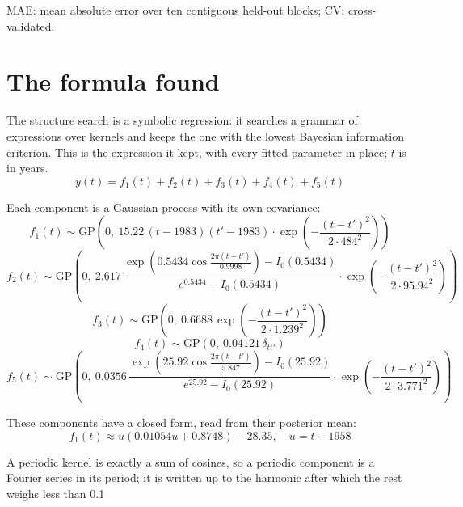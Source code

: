 \documentclass[11pt,a4paper]{article}
\begin{document}
MAE: mean absolute error over ten contiguous held-out blocks; CV: cross-validated.

\section*{The formula found}

The structure search is a symbolic regression: it searches a grammar of expressions over kernels and keeps the one with the lowest Bayesian information criterion. This is the expression it kept, with every fitted parameter in place; $t$ is in years.
\begin{dmath*}
y(t) = f_{1}(t) + f_{2}(t) + f_{3}(t) + f_{4}(t) + f_{5}(t)
\end{dmath*}

Each component is a Gaussian process with its own covariance:
\begin{dmath*}
f_{1}(t) \sim \mathrm{GP}\!\left(0,\ 15.22\,(t - 1983)(t' - 1983) \cdot \exp\!\left(-\frac{(t - t')^2}{2 \cdot 484^2}\right)\right)
\end{dmath*}
\begin{dmath*}
f_{2}(t) \sim \mathrm{GP}\!\left(0,\ 2.617\,\frac{\exp\!\left(0.5434\cos\frac{2\pi (t - t')}{0.9998}\right) - I_0(0.5434)}{e^{0.5434} - I_0(0.5434)} \cdot \exp\!\left(-\frac{(t - t')^2}{2 \cdot 95.94^2}\right)\right)
\end{dmath*}
\begin{dmath*}
f_{3}(t) \sim \mathrm{GP}\!\left(0,\ 0.6688\,\exp\!\left(-\frac{(t - t')^2}{2 \cdot 1.239^2}\right)\right)
\end{dmath*}
\begin{dmath*}
f_{4}(t) \sim \mathrm{GP}\!\left(0,\ 0.04121\,\delta_{t t'}\right)
\end{dmath*}
\begin{dmath*}
f_{5}(t) \sim \mathrm{GP}\!\left(0,\ 0.0356\,\frac{\exp\!\left(25.92\cos\frac{2\pi (t - t')}{5.847}\right) - I_0(25.92)}{e^{25.92} - I_0(25.92)} \cdot \exp\!\left(-\frac{(t - t')^2}{2 \cdot 3.771^2}\right)\right)
\end{dmath*}

These components have a closed form, read from their posterior mean:
\begin{dmath*}
f_{1}(t) \approx u \left(0.01054 u + 0.8748\right) - 28.35,\quad u = t - 1958
\end{dmath*}

A periodic kernel is exactly a sum of cosines, so a periodic component is a Fourier series in its period; it is written up to the harmonic after which the rest weighs less than 0.1 %
\end{document}
